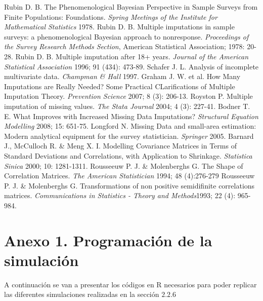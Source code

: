 \documentclass[a4paper,openright,12pt]{report}
\begin{document}
\begin{thebibliography}{99}
 Rubin D. B. The Phenomenological Bayesian Perspective in Sample Surveys from Finite Populations: Foundations. \textit{Spring Meetings of the Institute for Mathematical Statistics} 1978. 
 Rubin D. B. Multiple imputations in sample surveys: a phenomenological Bayesian approach to nonresponse. \textit{Proceedings of the Survey Research Methods Section}, American Statistical Association; 1978: 20-28. 
 Rubin D. B. Multiple imputation after 18+ years. \textit{Journal of the American Statistical Association} 1996; 91 (434): 473-89.
 Schafer J. L. Analysis of incomplete multivariate data. \textit{Champman \& Hall} 1997.
 Graham J. W. et al. How Many Imputations are Really Needed? Some Practical CLarifications of Multiple Imputation Theory. \textit{Prevention Science} 2007; 8 (3): 206-13.
 Royston P. Multiple imputation of missing values. \textit{The Stata Journal} 2004; 4 (3): 227-41.
 Bodner T. E. What Improves with Increased Missing Data Imputations? \textit{Structural Equation Modelling} 2008; 15: 651-75.
 Longford N. Missing Data and small-area estimation: Modern analytical equipment for the survey statistician. \textit{Springer} 2005.
 Barnard J., McCulloch R. \& Meng X. I. Modelling Covariance Matrices in Terms of Standard Deviations and Correlations, with Application to Shrinkage. \textit{Statistica Sinica} 2000; 10: 1281-1311.
 Rousseeuw P. J. \& Molenberghs G. The Shape of Correlation Matrices. \textit{The American Statistician} 1994; 48 (4):276-279
 Rousseeuw P. J. \& Molenberghs G. Transformations of non positive semidifinite correlations matrices. \textit{Communications in Statistics - Theory and Methods}1993; 22 (4): 965-984.
\end{thebibliography}

\chapter{Anexo 1. Programación de la simulación}\label{cap.simulacion}
A continuación se van a presentar los códigos en R necesarios para poder replicar las diferentes simulaciones realizadas en la sección $2.2.6$
\end{document}
